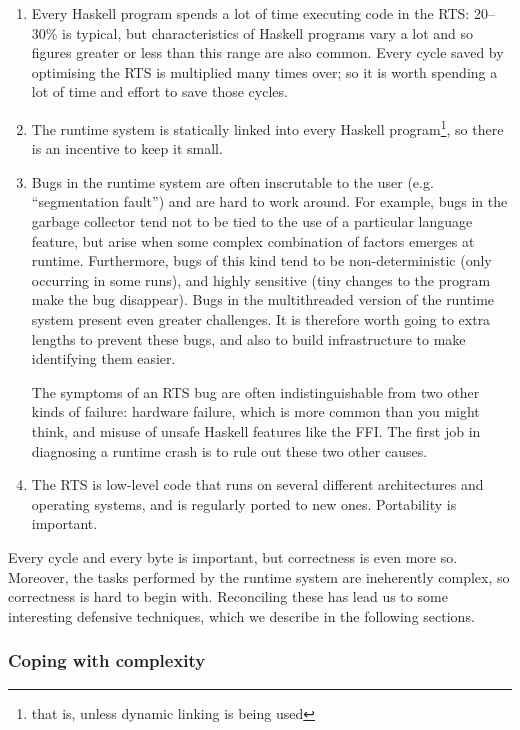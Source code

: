 \documentclass{article}
\begin{document}
\begin{enumerate}
\item Every Haskell program spends a lot of time executing code in the
  RTS: 20--30\% is typical, but characteristics of Haskell
  programs vary a lot and so figures greater or less than this range
  are also common.  Every cycle saved by optimising the RTS is
  multiplied many times over; so it is worth spending a lot of time
  and effort to save those cycles.

\item The runtime system is statically linked into every Haskell
  program\footnote{that is, unless dynamic linking is being used}, so
  there is an incentive to keep it small.

\item Bugs in the runtime system are often inscrutable to the user
  (e.g. ``segmentation fault'') and are hard to work around.  For
  example, bugs in the garbage collector tend not to be tied to the
  use of a particular language feature, but arise when some complex
  combination of factors emerges at runtime.  Furthermore, bugs of
  this kind tend to be non-deterministic (only occurring in some
  runs), and highly sensitive (tiny changes to the program make the
  bug disappear).  Bugs in the multithreaded version of the runtime
  system present even greater challenges.  It is therefore worth going
  to extra lengths to prevent these bugs, and also to build
  infrastructure to make identifying them easier.

  The symptoms of an RTS bug are often indistinguishable from two
  other kinds of failure: hardware failure, which is more common than
  you might think, and misuse of unsafe Haskell features like the FFI.
  The first job in diagnosing a runtime crash is to rule out these two
  other causes.

\item The RTS is low-level code that runs on several different
  architectures and operating systems, and is regularly ported to
  new ones.  Portability is important.
\end{enumerate}

Every cycle and every byte is important, but correctness is even more
so.  Moreover, the tasks performed by the runtime system are
ineherently complex, so correctness is hard to begin with.
Reconciling these has lead us to some interesting defensive
techniques, which we describe in the following sections.

\subsubsection{Coping with complexity}
\label{s:rtsbugs}
\end{document}
